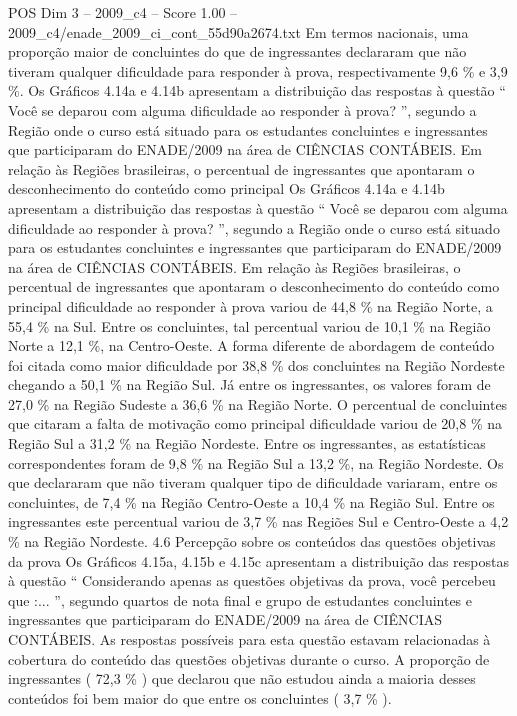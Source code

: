 \begin{textsample}{POS Dim 3 – 2009\_c4 – Score 1.00 – 2009\_c4/enade\_2009\_ci\_cont\_55d90a2674.txt}
Em termos nacionais, uma proporção maior de concluintes do que de ingressantes declararam que não tiveram qualquer dificuldade para responder à prova, respectivamente 9,6 \% e 3,9 \%.
Os Gráficos 4.14a e 4.14b apresentam a distribuição das respostas à questão “ Você se deparou com alguma dificuldade ao responder à prova? ”, segundo a Região onde o curso está situado para os estudantes concluintes e ingressantes que participaram do ENADE/2009 na área de CIÊNCIAS CONTÁBEIS.
Em relação às Regiões brasileiras, o percentual de ingressantes que apontaram o desconhecimento do conteúdo como principal Os Gráficos 4.14a e 4.14b apresentam a distribuição das respostas à questão “ Você se deparou com alguma dificuldade ao responder à prova? ”, segundo a Região onde o curso está situado para os estudantes concluintes e ingressantes que participaram do ENADE/2009 na área de CIÊNCIAS CONTÁBEIS.
Em relação às Regiões brasileiras, o percentual de ingressantes que apontaram o desconhecimento do conteúdo como principal dificuldade ao responder à prova variou de 44,8 \% na Região Norte, a 55,4 \% na Sul.
Entre os concluintes, tal percentual variou de 10,1 \% na Região Norte a 12,1 \%, na Centro-Oeste.
A forma diferente de abordagem de conteúdo foi citada como maior dificuldade por 38,8 \% dos concluintes na Região Nordeste chegando a 50,1 \% na Região Sul.
Já entre os ingressantes, os valores foram de 27,0 \% na Região Sudeste a 36,6 \% na Região Norte.
O percentual de concluintes que citaram a falta de motivação como principal dificuldade variou de 20,8 \% na Região Sul a 31,2 \% na Região Nordeste.
Entre os ingressantes, as estatísticas correspondentes foram de 9,8 \% na Região Sul a 13,2 \%, na Região Nordeste.
Os que declararam que não tiveram qualquer tipo de dificuldade variaram, entre os concluintes, de 7,4 \% na Região Centro-Oeste a 10,4 \% na Região Sul.
Entre os ingressantes este percentual variou de 3,7 \% nas Regiões Sul e Centro-Oeste a 4,2 \% na Região Nordeste. 4.6 Percepção sobre os conteúdos das questões objetivas da prova Os Gráficos 4.15a, 4.15b e 4.15c apresentam a distribuição das respostas à questão “ Considerando apenas as questões objetivas da prova, você percebeu que :... ”, segundo quartos de nota final e grupo de estudantes concluintes e ingressantes que participaram do ENADE/2009 na área de CIÊNCIAS CONTÁBEIS.
As respostas possíveis para esta questão estavam relacionadas à cobertura do conteúdo das questões objetivas durante o curso.
A proporção de ingressantes ( 72,3 \% ) que declarou que não estudou ainda a maioria desses conteúdos foi bem maior do que entre os concluintes ( 3,7 \% ).

\end{textsample}
